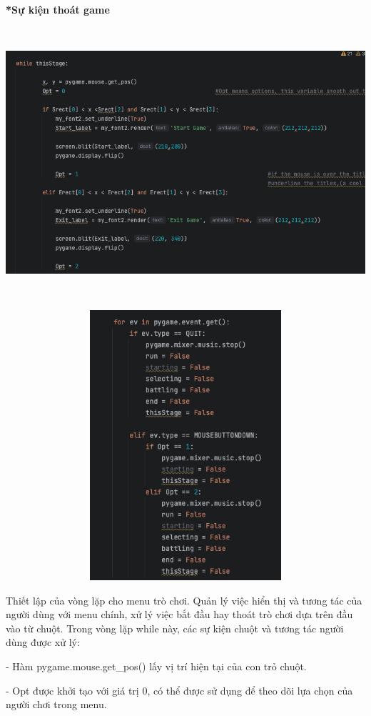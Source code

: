 \documentclass[a4paper]{article}
\begin{document}
        \textbf{*Sự kiện thoát game}

         \includegraphics[width=15cm,height=10cm]{imgcodeendgame.png}
         
         \includegraphics[width=15cm,height=10cm]{imgcodeendgame2.png}

        Thiết lập của vòng lặp cho menu trò chơi. Quản lý việc hiển thị và tương tác của người dùng với menu chính, xử lý việc bắt đầu hay thoát trò chơi dựa trên đầu vào từ chuột. Trong vòng lặp while này, các sự kiện chuột và tương tác người dùng được xử lý:

        - Hàm pygame.mouse.get_pos() lấy vị trí hiện tại của con trỏ chuột.
        
        - Opt được khởi tạo với giá trị 0, có thể được sử dụng để theo dõi lựa chọn của người chơi trong menu.
        
\end{document}
